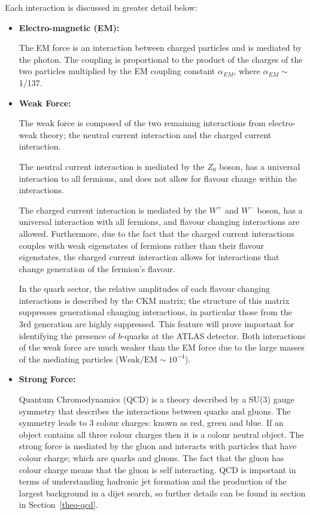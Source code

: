\noindent
Each interaction is discussed in greater detail below:
\begin{itemize}[leftmargin=*]
\item\textbf{Electro-magnetic (EM):}

  The EM force is an interaction between charged particles and is mediated by the photon.
  The coupling is proportional to the product of the charges of the two particles
  multiplied by the EM coupling constant $\alpha_{EM}$, where $\alpha_{EM} \sim$ 1/137.\\ %

\item\textbf{Weak Force:}
  
  The weak force is composed of the two remaining interactions from electro-weak theory;
  the neutral current interaction and the charged current interaction.
  
  The neutral current interaction is mediated by the $Z_0$ boson, has a universal interaction to all fermions,
  and does not allow for flavour change within the interactions.

  The charged current interaction is mediated by the $W^+$ and $W^-$ boson, has a universal interaction with all fermions,
  and flavour changing interactions are allowed.
  Furthermore, due to the fact that the charged current interactions couples with weak eigenstates of fermions rather than
  their flavour eigenstates, the charged current interaction allows for interactions that change generation of the fermion's flavour.
  
  In the quark sector, the relative amplitudes of each flavour changing interactions is described by the CKM matrix;
  the structure of this matrix suppresses generational changing interactions,
  in particular those from the 3rd generation  are highly suppressed.
  This feature will prove important for identifying the presence of $b$-quarks at the ATLAS detector.
  Both interactions of the weak force are much weaker than the EM force due to the large masses of the mediating particles
  ($\text{Weak}/\text{EM} \sim 10^{-4}$).\\ %
  
\item\textbf{Strong Force:}

  Quantum Chromodynamics (QCD) is a theory described by a SU(3) gauge symmetry that describes the interactions between quarks and gluons.
  The symmetry leads to 3 colour charges: known as red, green and blue.
  If an object contains all three colour charges then it is a colour neutral object.
  The strong force is mediated by the gluon and interacts with particles that have colour charge; which are quarks and gluons.
  The fact that the gluon has colour charge means that the gluon is self interacting.
  QCD is important in terms of understanding hadronic jet formation and the production of the
  largest background in a dijet search, so further details can be found in section in Section~\ref{theo-qcd}.\\


\end{itemize}
